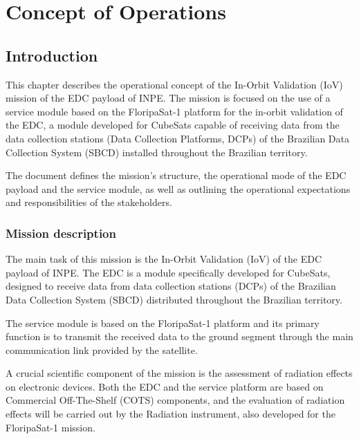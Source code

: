 %
%
%
%
%

%
%
%
%
%

\chapter{Concept of Operations} \label{ch:conops}

\section{Introduction}

This chapter describes the operational concept of the In-Orbit Validation (IoV) mission of the EDC payload of INPE. The mission is focused on the use of a service module based on the FloripaSat-1 platform for the in-orbit validation of the EDC, a module developed for CubeSats capable of receiving data from the data collection stations (Data Collection Platforms, DCPs) of the Brazilian Data Collection System (SBCD) installed throughout the Brazilian territory.

The document defines the mission's structure, the operational mode of the EDC payload and the service module, as well as outlining the operational expectations and responsibilities of the stakeholders.

\subsection{Mission description}

The main task of this mission is the In-Orbit Validation (IoV) of the EDC payload of INPE. The EDC is a module specifically developed for CubeSats, designed to receive data from data collection stations (DCPs) of the Brazilian Data Collection System (SBCD) distributed throughout the Brazilian territory.

The service module is based on the FloripaSat-1 platform and its primary function is to transmit the received data to the ground segment through the main communication link provided by the satellite.

A crucial scientific component of the mission is the assessment of radiation effects on electronic devices. Both the EDC and the service platform are based on Commercial Off-The-Shelf (COTS) components, and the evaluation of radiation effects will be carried out by the Radiation instrument, also developed for the FloripaSat-1 mission.

